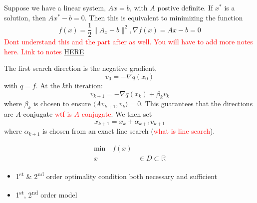 \begin{problem}
  Suppose we have a linear system, $Ax = b$, with $A$ postive definite. If $x^*$ is a solution, then $Ax^* - b = 0$. Then this is equivalent to minimizing the function $$f(x) = \frac{1}{2} \|A_x - b\|^2, \nabla f(x) = Ax - b = 0$$ \textcolor{red}{Dont understand this and the part after as well. You will have to add more notes here. Link to notes \href{https://cdn-uploads.piazza.com/paste/kcat3sa7dyu2te/bf8109b64a3bff7a1ffbacd0a5d43d03fabf0c01350afdf12f55b5382b6571da/Lecture_6.pdf}{HERE}}
\end{problem}
\begin{theorem}
  The first search direction is the negative gradient, $$v_0 = -\nabla q(x_0)$$ with $q = f$. At the $k$th iteration:
  $$v_{k+1} = -\nabla q(x_k) + \beta_k v_k$$
  where $\beta_k$ is chosen to ensure $\langle Av_{k+1}, v_k \rangle = 0$. This guarantees that the directions are $A$-conjugate \textcolor{red}{wtf is $A$ conjugate}. We then set $$x_{k+1} = x_k + \alpha_{k+1}v_{k+1}$$ where $\alpha_{k+1}$ is chosen from an exact line search (\textcolor{red}{what is line search}).
\end{theorem}


\begin{problem}
  \begin{align*}
    \text{min} \quad f(x)  \\
    x & \in D \subset \mathbb{R}
    \end{align*}
\end{problem}


\begin{itemize}
\item 1\textsuperscript{st} \& 2\textsuperscript{nd} order optimality condition both necessary and sufficient
\item 1\textsuperscript{st}, 2\textsuperscript{nd} order model
\end{itemize}

